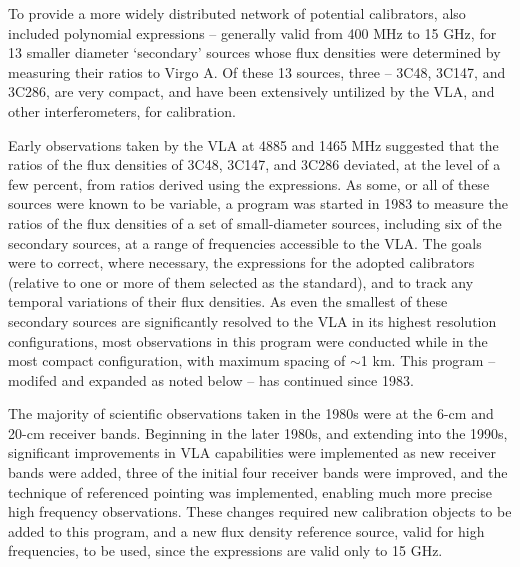 \documentclass{aastex}
\begin{document}
To provide a more widely distributed network of potential calibrators,
\citet{Baa77} also included polynomial expressions -- generally valid
from 400 MHz to 15 GHz, for 13 smaller diameter `secondary' sources
whose flux densities were determined by measuring their ratios to
Virgo A.  Of these 13 sources, three -- 3C48, 3C147, and 3C286, are
very compact, and have been extensively untilized by the VLA, and
other interferometers, for calibration.

Early observations taken by the VLA at 4885 and 1465 MHz suggested
that the ratios of the flux densities of 3C48, 3C147, and 3C286
deviated, at the level of a few percent, from ratios derived using the
\citet{Baa77} expressions.  As some, or all of these sources were
known to be variable, a program was started in 1983 to measure the
ratios of the flux densities of a set of small-diameter sources,
including six of the \citet{Baa77} secondary sources, at a range of
frequencies accessible to the VLA.  The goals were to correct, where
necessary, the \citet{Baa77} expressions for the adopted calibrators
(relative to one or more of them selected as the standard), and to
track any temporal variations of their flux densities.  As even the
smallest of these secondary sources are significantly resolved to the
VLA in its highest resolution configurations, most observations in
this program were conducted while in the most compact configuration,
with maximum spacing of $\sim$1 km.  This program -- modifed and
expanded as noted below -- has continued since 1983.

The majority of scientific observations taken in the 1980s were at the
6-cm and 20-cm receiver bands.  Beginning in the later 1980s, and
extending into the 1990s, significant improvements in VLA capabilities
were implemented as new receiver bands were added, three of the
initial four receiver bands were improved, and the technique of
referenced pointing was implemented, enabling much more precise high
frequency observations.  These changes required new calibration
objects to be added to this program, and a new flux density reference
source, valid for high frequencies, to be used, since the
\citet{Baa77} expressions are valid only to 15 GHz.
\end{document}

